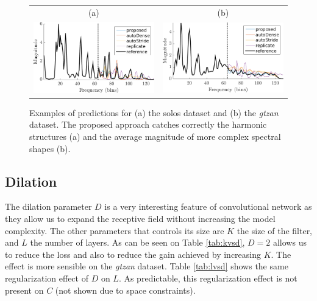 \documentclass{article}
\begin{document}
\begin{figure}[t]
\center
\begin{tabular}{cc}
  (a) & (b) \\
  \includegraphics[width = .95\columnwidth]{figures/solos_1141.png}
&
  \includegraphics[width = .95\columnwidth]{figures/gtzan_1120.png}
\end{tabular}
\caption{Examples of predictions for (a) the solos dataset and (b) the \textit{gtzan} dataset. The proposed approach catches correctly the harmonic structures (a) and the average magnitude of more complex spectral shapes (b).}
\label{fig:spec}
\end{figure}

\subsection*{Dilation}

The dilation parameter $D$ is a very interesting feature of convolutional network as they allow us to expand the receptive field without increasing the model complexity. The other parameters that controls its size are $K$ the size of the filter, and $L$ the number of layers. As can be seen on Table \ref{tab:kvsd}, $D=2$ allows us to reduce the loss and also to reduce the gain achieved by increasing $K$. The effect is more sensible on the \textit{gtzan} dataset. Table \ref{tab:lvsd} shows the same regularization effect of $D$ on $L$. As predictable, this regularization effect is not present on $C$ (not shown due to space constraints). %
\end{document}
